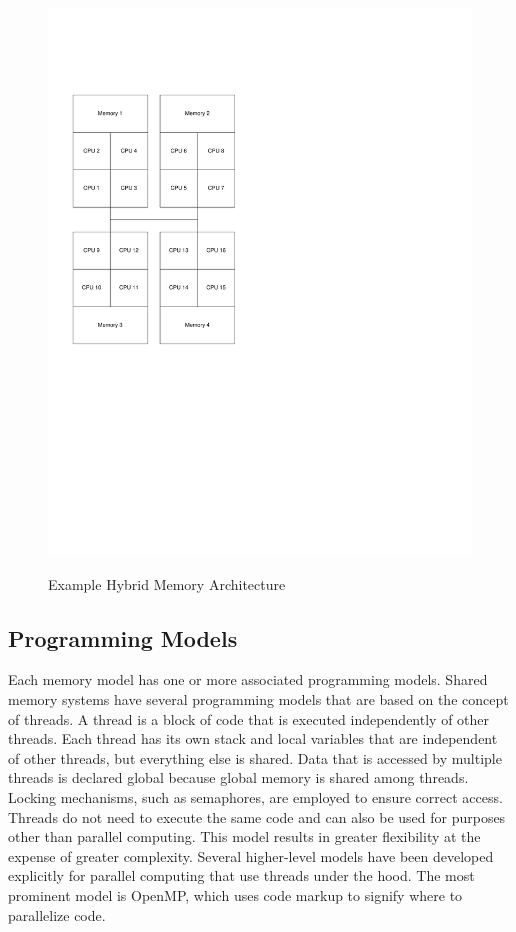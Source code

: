 \begin{figure}[ptb]
	\begin{centering}
		\includegraphics[height=6in]{Introduction/Figures/introduction-hybrid_memory.pdf}
		\caption{Example Hybrid Memory Architecture}
		\label{fig:introduction:hybrid_memory}
	\end{centering}
\end{figure}

\subsection{Programming Models}\label{sec:introduction:parallel_programming_overview:programming_models}

Each memory model has one or more associated programming models. Shared memory systems have several programming models that are based on the concept of threads. A thread is a block of code that is executed independently of other threads. Each thread has its own stack and local variables that are independent of other threads, but everything else is shared. Data that is accessed by multiple threads is declared global because global memory is shared among threads. Locking mechanisms, such as semaphores, are employed to ensure correct access. Threads do not need to execute the same code and can also be used for purposes other than parallel computing. This model results in greater flexibility at the expense of greater complexity. Several higher-level models have been developed explicitly for parallel computing that use threads under the hood. The most prominent model is OpenMP, which uses code markup to signify where to parallelize code.

